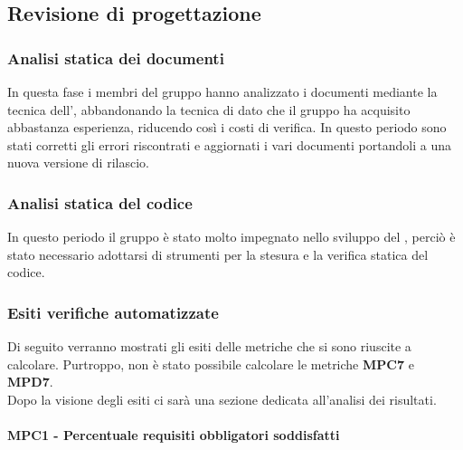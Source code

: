 \subsection{Revisione di progettazione}
\subsubsection{Analisi statica dei documenti}
In questa fase i membri del gruppo \Gruppo{} hanno analizzato i documenti mediante la tecnica dell', abbandonando la tecnica di  dato che il gruppo ha acquisito abbastanza esperienza, riducendo così i costi di verifica. In questo periodo sono stati corretti gli errori riscontrati e aggiornati i vari documenti portandoli a una nuova versione di rilascio.

\subsubsection{Analisi statica del codice}
In questo periodo il gruppo è stato molto impegnato nello sviluppo del , perciò è stato necessario adottarsi di strumenti per la stesura e la verifica statica del codice. 

\subsubsection{Esiti verifiche automatizzate}
Di seguito verranno mostrati gli esiti delle metriche che si sono riuscite a calcolare. Purtroppo, non è stato possibile calcolare le metriche \textbf{MPC7} e \textbf{MPD7}. \\ Dopo la visione degli esiti ci sarà una sezione dedicata all'analisi dei risultati.

\paragraph{MPC1 - Percentuale requisiti obbligatori soddisfatti} 

\pgfplotsset{width=17cm, height=8cm}

